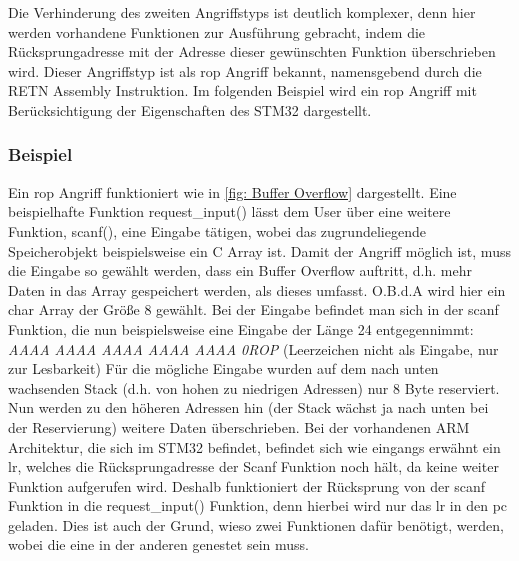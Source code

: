 \documentclass[a4paper,
DIV=13,
12pt,
BCOR=10mm,
department=FakIM,
oneside,
parskip=half,
automark,
listof=totocnumbered,
bibliography=totocnumbered,
acronym=totocnumbered
] {OTHRartcl}
\begin{document}
Die Verhinderung des zweiten Angriffstyps ist deutlich komplexer, denn hier werden vorhandene Funktionen zur Ausführung gebracht, indem die Rücksprungadresse mit der Adresse
dieser gewünschten Funktion überschrieben wird. %
Dieser Angriffstyp ist als \ac{rop} Angriff bekannt, namensgebend durch die RETN Assembly Instruktion.
Im folgenden Beispiel wird ein \ac{rop} Angriff mit Berücksichtigung der Eigenschaften des STM32 dargestellt.

\subsubsection{Beispiel}
Ein \ac{rop} Angriff funktioniert wie in \autoref{fig: Buffer Overflow} dargestellt.
Eine beispielhafte Funktion request\_input() lässt dem User über eine weitere Funktion, scanf(), eine Eingabe tätigen, wobei das zugrundeliegende Speicherobjekt beispielsweise ein C Array ist.
Damit der Angriff möglich ist, muss die Eingabe so gewählt werden, dass ein Buffer Overflow auftritt, d.h. mehr Daten in das Array gespeichert werden, als dieses umfasst.
O.B.d.A wird hier ein char Array der Größe 8 gewählt. Bei der Eingabe befindet man sich in der scanf Funktion, die nun beispielsweise eine Eingabe der Länge 24 entgegennimmt:
\textit{AAAA AAAA AAAA AAAA AAAA 0ROP}  (Leerzeichen nicht als Eingabe, nur zur Lesbarkeit)
Für die mögliche Eingabe wurden auf dem nach unten wachsenden Stack (d.h. von hohen zu niedrigen Adressen) nur 8 Byte reserviert.
Nun werden zu den höheren Adressen hin (der Stack wächst ja nach unten bei der Reservierung) weitere Daten überschrieben.
Bei der vorhandenen ARM Architektur, die sich im STM32 befindet, befindet sich wie eingangs erwähnt ein \ac{lr}, welches die Rücksprungadresse der Scanf Funktion noch hält, da keine weiter Funktion aufgerufen wird.
Deshalb funktioniert der Rücksprung von der scanf Funktion in die request\_input() Funktion, denn hierbei wird nur das \ac{lr} in den \ac{pc} geladen.
Dies ist auch der Grund, wieso zwei Funktionen dafür benötigt, werden, wobei die eine in der anderen genestet sein muss.
\end{document}
